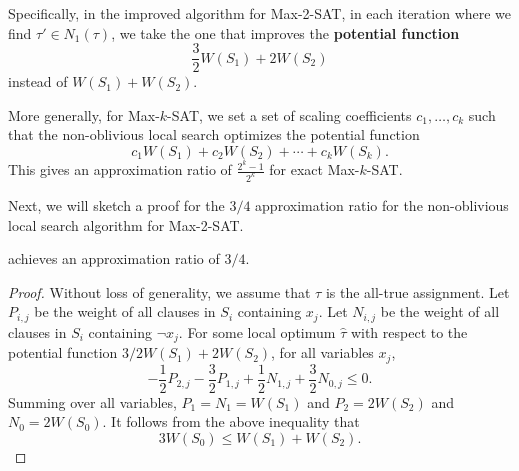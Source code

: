 Specifically, in the improved algorithm for Max-2-SAT, in each iteration where we find $\tau' \in N_1(\tau)$, we take the one that improves the \textbf{potential function}
$$
\frac{3}{2} W(S_1) + 2W(S_2)
$$
instead of $W(S_1) + W(S_2)$.

More generally, for Max-$k$-SAT, we set a set of scaling coefficients $c_1,\ldots,c_k$ such that the non-oblivious local search optimizes the potential function
$$
c_1W(S_1) + c_2W(S_2) + \cdots + c_k W(S_k).
$$
This gives an approximation ratio of $\frac{2^k - 1}{2^k}$ for exact Max-$k$-SAT.

Next, we will sketch a proof for the $3/4$ approximation ratio for the non-oblivious local search algorithm for Max-2-SAT.

\begin{theorem}
     achieves an approximation ratio of $3/4$.
\end{theorem}

\begin{proof}
    Without loss of generality, we assume that $\tau$ is the all-true assignment. Let $P_{i,j}$ be the weight of all clauses in $S_i$ containing $x_j$. Let $N_{i,j}$ be the weight of all clauses in $S_i$ containing $\neg x_j$. For some local optimum $\hat{\tau}$ with respect to the potential function $3/2 W(S_1) + 2W(S_2)$, for all variables $x_j$,
    $$
    -\frac{1}{2} P_{2,j} - \frac{3}{2} P_{1,j} + \frac{1}{2} N_{1,j} + \frac{3}{2} N_{0,j} \leq 0.
    $$
    Summing over all variables, $P_1 = N_1 = W(S_1)$ and $P_2 = 2W(S_2)$ and $N_0 = 2W(S_0)$. It follows from the above inequality that
    $$
    3W(S_0) \leq W(S_1) + W(S_2).
    $$
\end{proof}

